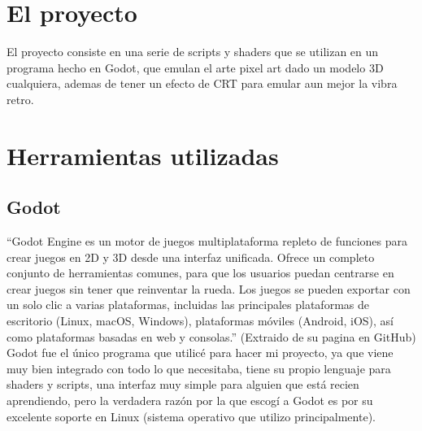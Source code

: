 %
%

\section{El proyecto}


El proyecto consiste en una serie de scripts y shaders que se utilizan en un programa hecho en Godot, que emulan el arte pixel art dado un modelo 
3D cualquiera, ademas de tener un efecto de CRT para emular aun mejor la vibra retro.

\section{Herramientas utilizadas}
\subsection{Godot}
        ``Godot Engine es un motor de juegos multiplataforma repleto de funciones para crear
        juegos en 2D y 3D desde una interfaz unificada. Ofrece un completo conjunto de herramientas comunes, para que los usuarios
        puedan centrarse en crear juegos sin tener que reinventar la rueda. Los juegos se pueden exportar con
        un solo clic a varias plataformas, incluidas las principales plataformas de escritorio (Linux, macOS, Windows),
        plataformas móviles (Android, iOS), así como plataformas basadas en web y consolas.'' (Extraido de su pagina en GitHub) \\

        Godot fue el único programa que utilicé para hacer mi proyecto, ya que viene muy bien integrado con todo lo que necesitaba, 
        tiene su propio lenguaje para shaders y scripts, una interfaz muy simple para alguien que está recien aprendiendo,
        pero la verdadera razón por la que escogí a Godot es por su excelente soporte en Linux (sistema operativo que utilizo principalmente). \\

